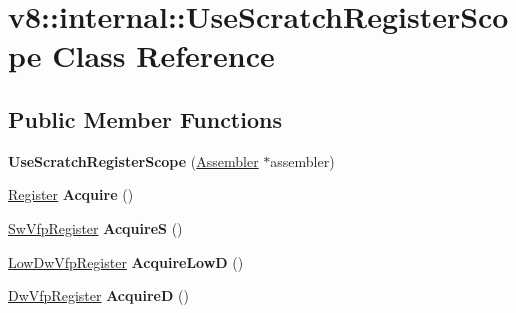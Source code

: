 \hypertarget{classv8_1_1internal_1_1UseScratchRegisterScope}{}\section{v8\+:\+:internal\+:\+:Use\+Scratch\+Register\+Scope Class Reference}
\label{classv8_1_1internal_1_1UseScratchRegisterScope}
\subsection*{Public Member Functions}
\begin{DoxyCompactItemize}
\item 
\mbox{\label{classv8_1_1internal_1_1UseScratchRegisterScope_a00236a6fc1861a00cdb5b0401d72d097}} 
{\bfseries Use\+Scratch\+Register\+Scope} (\mbox{\hyperlink{classv8_1_1internal_1_1Assembler}{Assembler}} $\ast$assembler)
\item 
\mbox{\label{classv8_1_1internal_1_1UseScratchRegisterScope_a18d5cc87e6ecaf4f254b626487145a37}} 
\mbox{\hyperlink{classv8_1_1internal_1_1Register}{Register}} {\bfseries Acquire} ()
\item 
\mbox{\label{classv8_1_1internal_1_1UseScratchRegisterScope_aed309680e336defef0dd75a76b77052c}} 
\mbox{\hyperlink{classv8_1_1internal_1_1SwVfpRegister}{Sw\+Vfp\+Register}} {\bfseries AcquireS} ()
\item 
\mbox{\label{classv8_1_1internal_1_1UseScratchRegisterScope_a512e0a9b2e665f6571dabfe45c85bd0b}} 
\mbox{\hyperlink{classv8_1_1internal_1_1LowDwVfpRegister}{Low\+Dw\+Vfp\+Register}} {\bfseries Acquire\+LowD} ()
\item 
\mbox{\label{classv8_1_1internal_1_1UseScratchRegisterScope_a87482e1eef4bbfbc8afdfd22ed955d12}} 
\mbox{\hyperlink{classv8_1_1internal_1_1DwVfpRegister}{Dw\+Vfp\+Register}} {\bfseries AcquireD} ()
\item 
\mbox{\label{classv8_1_1internal_1_1UseScratchRegisterScope_af8452b11d10f29816a49f4d9fa3f399d}} 

\end{DoxyCompactItemize}
